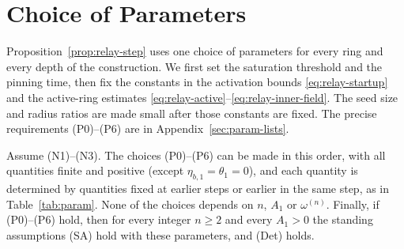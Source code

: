 \section{Choice of Parameters}
\label{sec:param}

Proposition~\ref{prop:relay-step} uses one choice of parameters for every
ring and every depth of the construction. We first set the saturation threshold and the
pinning time, then fix the constants in the activation bounds
\eqref{eq:relay-startup} and the active-ring estimates
\eqref{eq:relay-active}--\eqref{eq:relay-inner-field}.
The seed size and radius ratios are made small after those constants are
fixed. The precise requirements (P0)--(P6) are in
Appendix~\ref{sec:param-lists}.

\begin{lemma}
\label{lem:nonempty}
Assume \textup{(N1)}--\textup{(N3)}. The choices (P0)--(P6) can be made in this
order, with all quantities finite and positive (except $\eta_{b,1}=\theta_1=0$),
and each quantity is determined by quantities fixed at earlier steps or earlier in the same step, as in
Table~\ref{tab:param}. None of the choices depends on $n$, $A_1$ or
$\omega^{(n)}$. Finally, if (P0)--(P6) hold, then for every integer $n\ge2$ and
every $A_1>0$ the standing assumptions (SA) hold with these parameters, and
(Det) holds.
\end{lemma}

